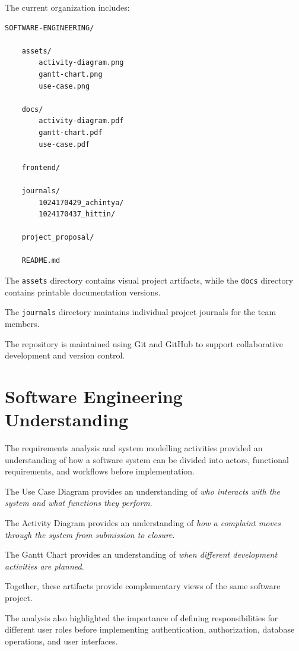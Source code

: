\documentclass[12pt,a4paper]{article}
\begin{document}
The current organization includes:

\begin{verbatim}
SOFTWARE-ENGINEERING/

    assets/
        activity-diagram.png
        gantt-chart.png
        use-case.png

    docs/
        activity-diagram.pdf
        gantt-chart.pdf
        use-case.pdf

    frontend/

    journals/
        1024170429_achintya/
        1024170437_hittin/

    project_proposal/

    README.md
\end{verbatim}

The \texttt{assets} directory contains visual project artifacts, while the \texttt{docs} directory contains printable documentation versions.

The \texttt{journals} directory maintains individual project journals for the team members.

The repository is maintained using Git and GitHub to support collaborative development and version control.


\section{Software Engineering Understanding}

The requirements analysis and system modelling activities provided an understanding of how a software system can be divided into actors, functional requirements, and workflows before implementation.

The Use Case Diagram provides an understanding of \emph{who interacts with the system and what functions they perform}.

The Activity Diagram provides an understanding of \emph{how a complaint moves through the system from submission to closure}.

The Gantt Chart provides an understanding of \emph{when different development activities are planned}.

Together, these artifacts provide complementary views of the same software project.

The analysis also highlighted the importance of defining responsibilities for different user roles before implementing authentication, authorization, database operations, and user interfaces.
\end{document}
